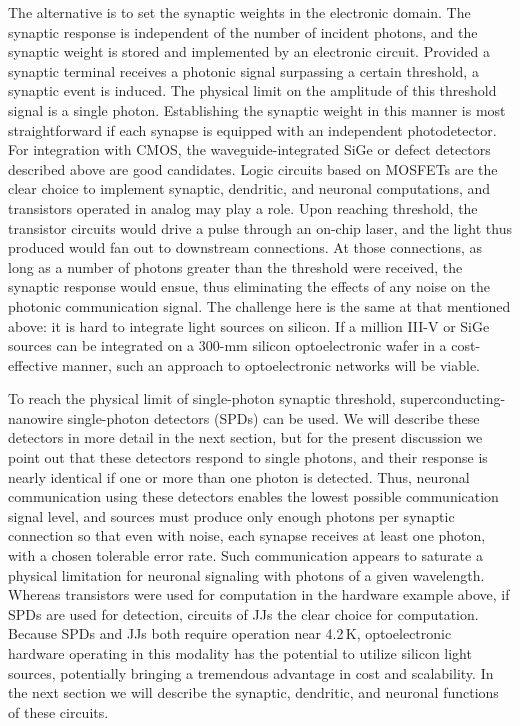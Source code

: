 The alternative is to set the synaptic weights in the electronic domain. The synaptic response is independent of the number of incident photons, and the synaptic weight is stored and implemented by an electronic circuit. Provided a synaptic terminal receives a photonic signal surpassing a certain threshold, a synaptic event is induced. The physical limit on the amplitude of this threshold signal is a single photon. Establishing the synaptic weight in this manner is most straightforward if each synapse is equipped with an independent photodetector. For integration with CMOS, the waveguide-integrated SiGe or defect detectors described above are good candidates. Logic circuits based on MOSFETs are the clear choice to implement synaptic, dendritic, and neuronal computations, and transistors operated in analog may play a role. Upon reaching threshold, the transistor circuits would drive a pulse through an on-chip laser, and the light thus produced would fan out to downstream connections. At those connections, as long as a number of photons greater than the threshold were received, the synaptic response would ensue, thus eliminating the effects of any noise on the photonic communication signal. The challenge here is the same at that mentioned above: it is hard to integrate light sources on silicon. If a million III-V or SiGe sources can be integrated on a 300-mm silicon optoelectronic wafer in a cost-effective manner, such an approach to optoelectronic networks will be viable.

To reach the physical limit of single-photon synaptic threshold, superconducting-nanowire single-photon detectors (SPDs) can be used. We will describe these detectors in more detail in the next section, but for the present discussion we point out that these detectors respond to single photons, and their response is nearly identical \cite{} if one or more than one photon is detected. Thus, neuronal communication using these detectors enables the lowest possible communication signal level, and sources must produce only enough photons per synaptic connection so that even with noise, each synapse receives at least one photon, with a chosen tolerable error rate. Such communication appears to saturate a physical limitation for neuronal signaling with photons of a given wavelength. Whereas transistors were used for computation in the hardware example above, if SPDs are used for detection, circuits of JJs the clear choice for computation. Because SPDs and JJs both require operation near 4.2\,K, optoelectronic hardware operating in this modality has the potential to utilize silicon light sources, potentially bringing a tremendous advantage in cost and scalability. In the next section we will describe the synaptic, dendritic, and neuronal functions of these circuits. 

